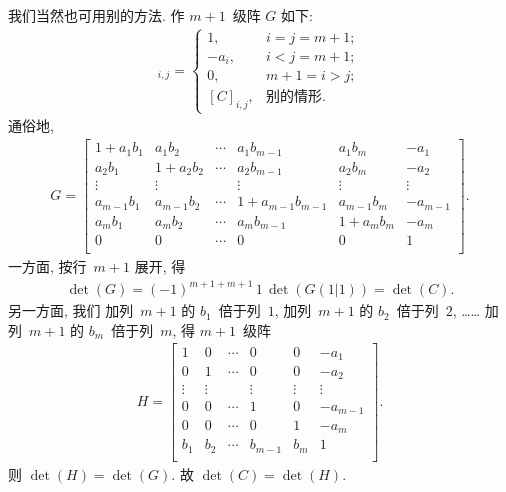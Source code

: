 \documentclass[../libro.tex]{subfiles}
\begin{document}
\begin{example}
    我们当然也可用别的方法.
    作 \(m+1\)~级阵 \(G\) 如下:
    \begin{align*}
        [G]_{i,j} =
        \begin{cases}
            1,         & i = j = m+1; \\
            -a_i,      & i < j = m+1; \\
            0,         & m+1 = i > j; \\
            [C]_{i,j}, & \text{别的情形}.
        \end{cases}
    \end{align*}
    通俗地,
    \begin{align*}
        G =
        \begin{bmatrix}
            1 + a_1 b_1 & a_1 b_2     & \cdots & a_1 b_{m-1}         & a_1 b_m     & -a_1     \\
            a_2 b_1     & 1 + a_2 b_2 & \cdots & a_2 b_{m-1}         & a_2 b_m     & -a_2     \\
            \vdots      & \vdots      & {}     & \vdots              & \vdots      & \vdots   \\
            a_{m-1} b_1 & a_{m-1} b_2 & \cdots & 1 + a_{m-1} b_{m-1} & a_{m-1} b_m & -a_{m-1} \\
            a_m b_1     & a_m b_2     & \cdots & a_m b_{m-1}         & 1 + a_m b_m & -a_m     \\
            0           & 0           & \cdots & 0                   & 0           & 1        \\
        \end{bmatrix}.
    \end{align*}
    一方面, 按行~\(m+1\) 展开, 得
    \begin{align*}
        \det {(G)}
        = (-1)^{m+1+m+1}\,1\,\det {(G(1|1))}
        = \det {(C)}.
    \end{align*}
    另一方面, 我们%
    加列~\(m+1\) 的 \(b_1\)~倍于列~\(1\),
    加列~\(m+1\) 的 \(b_2\)~倍于列~\(2\),
    ……
    加列~\(m+1\) 的 \(b_m\)~倍于列~\(m\),
    得 \(m+1\)~级阵
    \begin{align*}
        H =
        \begin{bmatrix}
            1      & 0      & \cdots & 0       & 0      & -a_1     \\
            0      & 1      & \cdots & 0       & 0      & -a_2     \\
            \vdots & \vdots & {}     & \vdots  & \vdots & \vdots   \\
            0      & 0      & \cdots & 1       & 0      & -a_{m-1} \\
            0      & 0      & \cdots & 0       & 1      & -a_m     \\
            b_1    & b_2    & \cdots & b_{m-1} & b_m    & 1        \\
        \end{bmatrix}.
    \end{align*}
    则 \(\det {(H)} = \det {(G)}\).
    故 \(\det {(C)} = \det {(H)}\).


\end{example}
\end{document}
